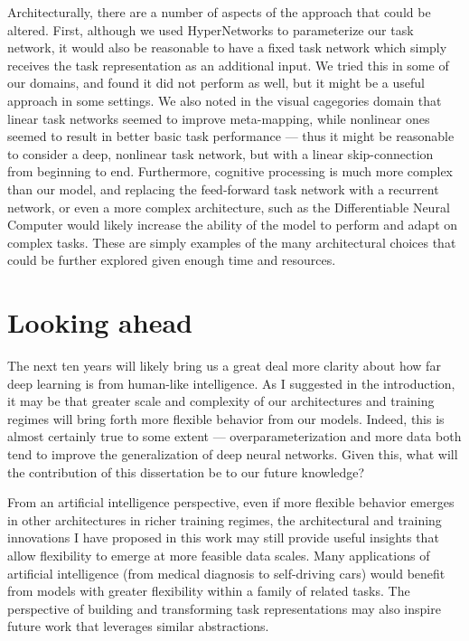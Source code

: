 Architecturally, there are a number of aspects of the approach that could be altered. First, although we used HyperNetworks to parameterize our task network, it would also be reasonable to have a fixed task network which simply receives the task representation as an additional input. We tried this in some of our domains, and found it did not perform as well, but it might be a useful approach in some settings. We also noted in the visual cagegories domain that linear task networks seemed to improve meta-mapping, while nonlinear ones seemed to result in better basic task performance --- thus it might be reasonable to consider a deep, nonlinear task network, but with a linear skip-connection from beginning to end. Furthermore, cognitive processing is much more complex than our model, and replacing the feed-forward task network with a recurrent network, or even a more complex architecture, such as the Differentiable Neural Computer \citep{Graves2016} would likely increase the ability of the model to perform and adapt on complex tasks. These are simply examples of the many architectural choices that could be further explored given enough time and resources. \par

\section{Looking ahead}

The next ten years will likely bring us a great deal more clarity about how far deep learning is from human-like intelligence. As I suggested in the introduction, it may be that greater scale and complexity of our architectures and training regimes will bring forth more flexible behavior from our models. Indeed, this is almost certainly true to some extent --- overparameterization and more data both tend to improve the generalization of deep neural networks. Given this, what will the contribution of this dissertation be to our future knowledge? \par 

From an artificial intelligence perspective, even if more flexible behavior emerges in other architectures in richer training regimes, the architectural and training innovations I have proposed in this work may still provide useful insights that allow flexibility to emerge at more feasible data scales. Many applications of artificial intelligence (from medical diagnosis to self-driving cars) would benefit from models with greater flexibility within a family of related tasks. The perspective of building and transforming task representations may also inspire future work that leverages similar abstractions. \par 

